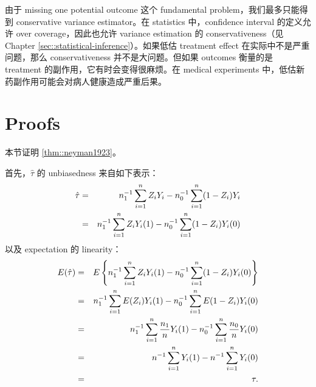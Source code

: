 由于 missing one potential outcome 这个 fundamental problem，我们最多只能得到 conservative variance estimator。在 statistics 中，confidence interval 的定义允许 over coverage，因此也允许 variance estimation 的 conservativeness（见 Chapter \ref{sec::statistical-inference}）。如果低估 treatment effect 在实际中不是严重问题，那么 conservativeness 并不是大问题。但如果 outcomes 衡量的是 treatment 的副作用，它有时会变得很麻烦。在 medical experiments 中，低估新药副作用可能会对病人健康造成严重后果。



\section{Proofs}\label{sec::prove-neyman-1923}

本节证明 \cref{thm::neyman1923}。


首先，$\hat{\tau}$ 的 unbiasedness 来自如下表示：
\begin{eqnarray*}
\hat{\tau} &=& n_1^{-1} \sum_{i=1}^n Z_i Y_i - n_0^{-1} \sum_{i=1}^n (1-Z_i) Y_i \\
&=& n_1^{-1} \sum_{i=1}^n Z_i Y_i(1) - n_0^{-1} \sum_{i=1}^n (1-Z_i) Y_i(0)
\end{eqnarray*}
以及 expectation 的 linearity：
\begin{eqnarray*}
E( \hat{\tau}  ) &=& E\left\{    n_1^{-1} \sum_{i=1}^n Z_i Y_i(1) - n_0^{-1} \sum_{i=1}^n (1-Z_i) Y_i(0)   \right\} \\
&=& n_1^{-1} \sum_{i=1}^n E(Z_i) Y_i(1) - n_0^{-1} \sum_{i=1}^n E(1-Z_i) Y_i(0) \\
&=& n_1^{-1} \sum_{i=1}^n \frac{n_1}{n} Y_i(1) - n_0^{-1} \sum_{i=1}^n \frac{n_0}{n} Y_i(0) \\
&=&  n^{-1} \sum_{i=1}^n Y_i(1) - n^{-1} \sum_{i=1}^n Y_i(0) \\
&=& \tau .
\end{eqnarray*}


